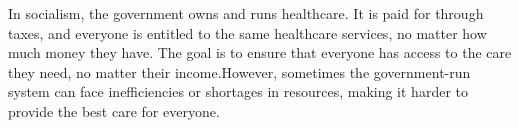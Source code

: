 \par
In socialism, the government owns and runs healthcare. 
It is paid for through taxes, and everyone is entitled to the same 
healthcare services, no matter how much money they have. 
The goal is to ensure that everyone has access to the care they need, 
no matter their income.However, sometimes the government-run 
system can face inefficiencies or shortages in resources, 
making it harder to provide the best care for everyone.